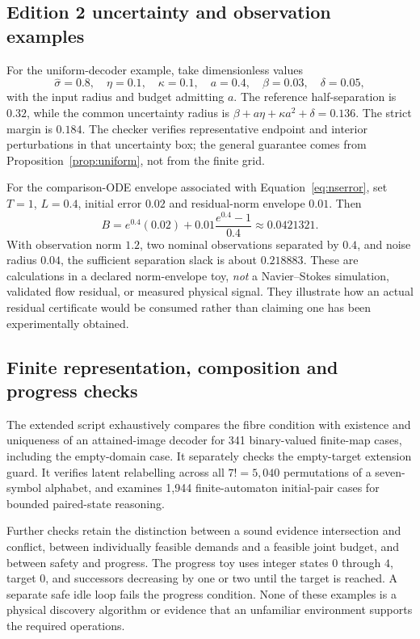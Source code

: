 \documentclass[11pt,a4paper]{article}
\theoremstyle{definition}
\theoremstyle{remark}
\begin{document}
\subsection{Edition 2 uncertainty and observation examples}
For the uniform-decoder example, take dimensionless values
\[
 \hat\sigma=0.8,\quad\eta=0.1,\quad\kappa=0.1,\quad
 a=0.4,\quad\beta=0.03,\quad\delta=0.05,
\]
with the input radius and budget admitting $a$. The reference half-separation is $0.32$, while the common uncertainty radius is
$\beta+a\eta+\kappa a^2+\delta=0.136$. The strict margin is $0.184$. The checker verifies representative endpoint and interior perturbations in that uncertainty box; the general guarantee comes from Proposition~\ref{prop:uniform}, not from the finite grid.

For the comparison-ODE envelope associated with Equation~\eqref{eq:nserror}, set $T=1$, $L=0.4$, initial error $0.02$ and residual-norm envelope $0.01$. Then
\[
 B=e^{0.4}(0.02)+0.01\frac{e^{0.4}-1}{0.4}\approx0.0421321.
\]
With observation norm $1.2$, two nominal observations separated by $0.4$, and noise radius $0.04$, the sufficient separation slack is about $0.218883$. These are calculations in a declared norm-envelope toy, \emph{not} a Navier--Stokes simulation, validated flow residual, or measured physical signal. They illustrate how an actual residual certificate would be consumed rather than claiming one has been experimentally obtained.

\subsection{Finite representation, composition and progress checks}
The extended script exhaustively compares the fibre condition with existence and uniqueness of an attained-image decoder for 341 binary-valued finite-map cases, including the empty-domain case. It separately checks the empty-target extension guard. It verifies latent relabelling across all $7!=5{,}040$ permutations of a seven-symbol alphabet, and examines 1,944 finite-automaton initial-pair cases for bounded paired-state reasoning.

Further checks retain the distinction between a sound evidence intersection and conflict, between individually feasible demands and a feasible joint budget, and between safety and progress. The progress toy uses integer states $0$ through $4$, target $0$, and successors decreasing by one or two until the target is reached. A separate safe idle loop fails the progress condition. None of these examples is a physical discovery algorithm or evidence that an unfamiliar environment supports the required operations.
\end{document}
